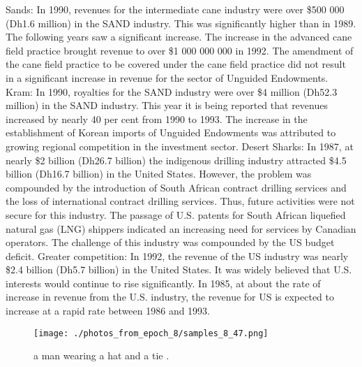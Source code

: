 \documentclass{article}%
\begin{document}
Sands:\newline%
In 1990, revenues for the intermediate cane industry were over \$500 000 (Dh1.6 million) in the SAND industry. This was significantly higher than in 1989. The following years saw a significant increase. The increase in the advanced cane field practice brought revenue to over \$1 000 000 000 in 1992. The amendment of the cane field practice to be covered under the cane field practice did not result in a significant increase in revenue for the sector of Unguided Endowments.\newline%
Kram:\newline%
In 1990, royalties for the SAND industry were over \$4 million (Dh52.3 million) in the SAND industry. This year it is being reported that revenues increased by nearly 40 per cent from 1990 to 1993. The increase in the establishment of Korean imports of Unguided Endowments was attributed to growing regional competition in the investment sector.\newline%
Desert Sharks:\newline%
In 1987, at nearly \$2 billion (Dh26.7 billion) the indigenous drilling industry attracted \$4.5 billion (Dh16.7 billion) in the United States. However, the problem was compounded by the introduction of South African contract drilling services and the loss of international contract drilling services. Thus, future activities were not secure for this industry. The passage of U.S. patents for South African liquefied natural gas (LNG) shippers indicated an increasing need for services by Canadian operators. The challenge of this industry was compounded by the US budget deficit.\newline%
Greater competition:\newline%
In 1992, the revenue of the US industry was nearly \$2.4 billion (Dh5.7 billion) in the United States. It was widely believed that U.S. interests would continue to rise significantly. In 1985, at about the rate of increase in revenue from the U.S. industry, the revenue for US is expected to increase at a rapid rate between 1986 and 1993.\newline%

%


\begin{figure}[h!]%
\centering%
\texttt{[image: ./photos\_from\_epoch\_8/samples\_8\_47.png]}%
\caption{a man wearing a hat and a tie .}%
\end{figure}

%
\end{document}
